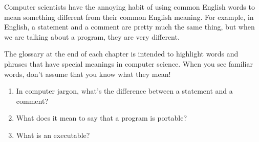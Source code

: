 
\begin{exercise}

Computer scientists have the annoying habit of using common
English words to mean something different from their common
English meaning.  For example, in English, a statement and
a comment are pretty much the same thing, but when we are
talking about a program, they are very different.

The glossary at the end of each chapter is intended to highlight
words and phrases that have special meanings in computer science.
When you see familiar words, don't assume that you know what 
they mean!

\begin{enumerate}

\item In computer jargon, what's the difference between a statement
and a comment?

\item What does it mean to say that a program is portable?

\item What is an executable?

\end{enumerate}

\end{exercise}

